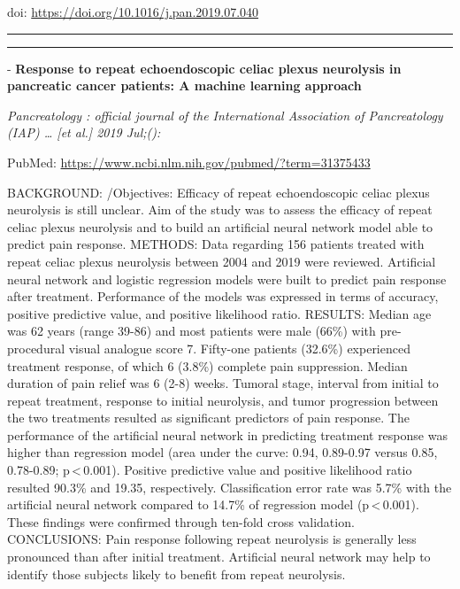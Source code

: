 \documentclass[]{article}
\begin{document}
doi: \url{https://doi.org/10.1016/j.pan.2019.07.040}

{}

{}

\begin{center}\rule{0.5\linewidth}{\linethickness}\end{center}

\begin{center}\rule{0.5\linewidth}{\linethickness}\end{center}

 - \textbf{Response to repeat echoendoscopic celiac plexus neurolysis in
pancreatic cancer patients: A machine learning approach}

\emph{Pancreatology : official journal of the International Association
of Pancreatology (IAP) \ldots{} {[}et al.{]} 2019 Jul;():}

PubMed: \url{https://www.ncbi.nlm.nih.gov/pubmed/?term=31375433}

BACKGROUND: /Objectives: Efficacy of repeat echoendoscopic celiac plexus
neurolysis is still unclear. Aim of the study was to assess the efficacy
of repeat celiac plexus neurolysis and to build an artificial neural
network model able to predict pain response. METHODS: Data regarding 156
patients treated with repeat celiac plexus neurolysis between 2004 and
2019 were reviewed. Artificial neural network and logistic regression
models were built to predict pain response after treatment. Performance
of the models was expressed in terms of accuracy, positive predictive
value, and positive likelihood ratio. RESULTS: Median age was 62 years
(range 39-86) and most patients were male (66\%) with pre-procedural
visual analogue score 7. Fifty-one patients (32.6\%) experienced
treatment response, of which 6 (3.8\%) complete pain suppression. Median
duration of pain relief was 6 (2-8) weeks. Tumoral stage, interval from
initial to repeat treatment, response to initial neurolysis, and tumor
progression between the two treatments resulted as significant
predictors of pain response. The performance of the artificial neural
network in predicting treatment response was higher than regression
model (area under the curve: 0.94, 0.89-0.97 versus 0.85, 0.78-0.89;
p\,\textless{}\,0.001). Positive predictive value and positive
likelihood ratio resulted 90.3\% and 19.35, respectively. Classification
error rate was 5.7\% with the artificial neural network compared to
14.7\% of regression model (p\,\textless{}\,0.001). These findings were
confirmed through ten-fold cross validation. CONCLUSIONS: Pain response
following repeat neurolysis is generally less pronounced than after
initial treatment. Artificial neural network may help to identify those
subjects likely to benefit from repeat neurolysis.
\end{document}
